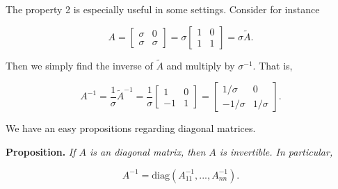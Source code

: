 \documentclass[a4paper,10pt,openany]{book}
\begin{document}
The property 2 is especially useful in some settings. Consider for instance

\[
A=
\begin{bmatrix}
\sigma & 0\\
\sigma & \sigma
\end{bmatrix}=\sigma\begin{bmatrix}
1 & 0\\
1 & 1
\end{bmatrix}=\sigma \tilde{A}.
\]

Then we simply find the inverse of \(\tilde{A}\) and multiply by \(\sigma^{-1}\). That is,

\[
A^{-1}=\frac{1}{\sigma}\tilde{A}^{-1}=\frac{1}{\sigma}
\begin{bmatrix}
1 & 0\\
-1 & 1
\end{bmatrix}=
\begin{bmatrix}
1/\sigma & 0\\
-1/\sigma & 1/\sigma
\end{bmatrix}.
\]

We have an easy propositions regarding diagonal matrices.

\textbf{Proposition.} \emph{If \(A\) is an diagonal matrix, then \(A\) is invertible. In particular,}

\[
A^{-1}=\text{diag}(A_{11}^{-1},...,A_{nn}^{-1}).
\]

\newpage
{}
\nocite{*}
{}

\begin{spacing}{1}

\end{spacing}

\newpage
{}
{}
\begin{spacing}{1}
\printindex
\end{spacing}
\end{document}
